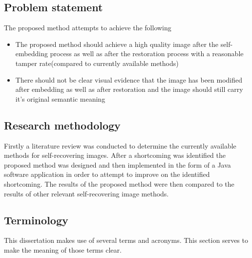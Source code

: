 \documentclass[12pt]{article}
\begin{document}
\subsection{Problem statement}
The proposed method attempts to achieve the following
\begin{itemize}
	\item The proposed method should achieve a high quality image after the self-embedding process as well as after the restoration process with a reasonable tamper rate(compared to currently available methods)
	\item There should not be clear visual evidence that the image has been modified after embedding as well as after restoration and the image should still carry it's original semantic meaning
\end{itemize}

\subsection{Research methodology}
Firstly a literature review was conducted to determine the currently available methods for self-recovering images. 
After a shortcoming was identified the proposed method was designed and then implemented in the form of a Java software application in order to attempt to improve on the identified shortcoming. 
The results of the proposed method were then compared to the results of other relevant self-recovering image methods.

\subsection{Terminology}
This dissertation makes use of several terms and acronyms.
This section serves to make the meaning of those terms clear.
\end{document}
